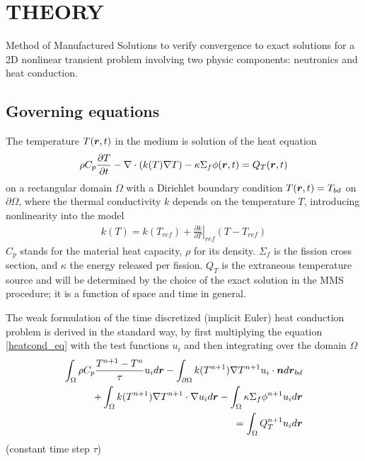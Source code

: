 \section*{THEORY}
\vspace{-4mm}
Method of Manufactured Solutions to verify convergence to exact solutions for a 2D nonlinear transient problem involving two physic components: neutronics and heat conduction.

\subsection*{Governing equations}

The temperature $T(\boldsymbol{r}, t)$ in the medium is solution of the heat equation 
\begin{align}
  \rho C_p \frac{\partial T}{\partial t} 
  - \nabla\cdot(k(T) \nabla T) 
  - \kappa \Sigma_{f} \phi(\boldsymbol{r},t)
  = Q_T(\boldsymbol{r},t) \label{heatcond_eq}
\end{align}
on a rectangular domain $\Omega$ with a  Dirichlet boundary condition $T(\boldsymbol{r},t) = T_{bd}$ on $\partial\Omega$, where the thermal conductivity $k$ depends on the temperature $T$, introducing nonlinearity into the model
\begin{align}
  k(T) = k(T_{ref}) + \left. \frac{\partial k}{\partial T}\right|_{ref} \left( T - T_{ref} \right)
\end{align}
%
$C_p$ stands for the material heat capacity, $\rho$ for its density.  $\Sigma_f$ is the fission cross section, and $\kappa$ the energy released per fission.  $Q_T$ is the extraneous temperature source and will be determined by the choice of the exact solution in the MMS procedure; it is a function of space and time in general.

The weak formulation of the time discretized (implicit Euler) heat conduction problem is derived in the standard way, by first multiplying the equation \eqref{heatcond_eq} with the test functions $u_{i}$ and then integrating over the domain $\Omega$
\begin{align}
  \int_{\Omega} \rho C_p \frac{T^{n+1}-T{^n}}{\tau} u_i d\boldsymbol{r} 
  - \int_{\partial\Omega} k(T^{n+1}) \nabla T^{n+1} u_i \cdot \boldsymbol{n} d\boldsymbol{r}_{bd}&  \nonumber \\
  + \int_{\Omega} k(T^{n+1}) \nabla T^{n+1} \cdot \nabla u_i d\boldsymbol{r}
  - \int_{\Omega} \kappa \Sigma_{f} \phi^{n+1} u_i d\boldsymbol{r}& \nonumber \\
  = \int_{\Omega} Q_T^{n+1} u_i d\boldsymbol{r}& \label{heatcond_wf}
\end{align}
(constant time step $\tau$)

